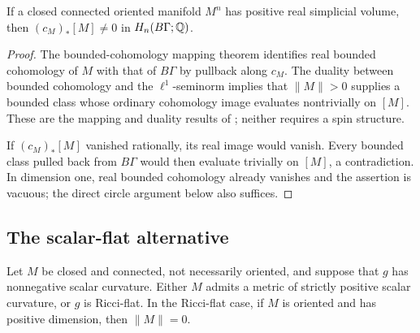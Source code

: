 \begin{lemma}
\label{lem:essentiality}
If a closed connected oriented manifold $M^n$ has positive real simplicial
volume, then $(c_M)_*[M]\ne0$ in $H_n(B\Gamma;\mathbb Q)$.
\end{lemma}

\begin{proof}
The bounded-cohomology mapping theorem identifies real bounded cohomology of
$M$ with that of $B\Gamma$ by pullback along $c_M$. The duality between
bounded cohomology and the $\ell^1$-seminorm implies that
$\|M\|>0$ supplies a bounded class whose ordinary cohomology image evaluates
nontrivially on $[M]$. These are the mapping and duality results of
\cite{Gromov1982}; neither requires a spin structure.

If $(c_M)_*[M]$ vanished rationally, its real image would vanish. Every bounded
class pulled back from $B\Gamma$ would then evaluate trivially on $[M]$, a
contradiction. In dimension one, real bounded cohomology already vanishes and
the assertion is vacuous; the direct circle argument below also suffices.
\end{proof}

\subsection{The scalar-flat alternative}

\begin{lemma}
\label{lem:scalar-reduction}
Let $M$ be closed and connected, not necessarily oriented, and suppose that
$g$ has nonnegative scalar curvature. Either $M$ admits a metric of strictly positive scalar curvature,
or $g$ is Ricci-flat. In the Ricci-flat case, if $M$ is oriented and has
positive dimension, then $\|M\|=0$.
\end{lemma}

